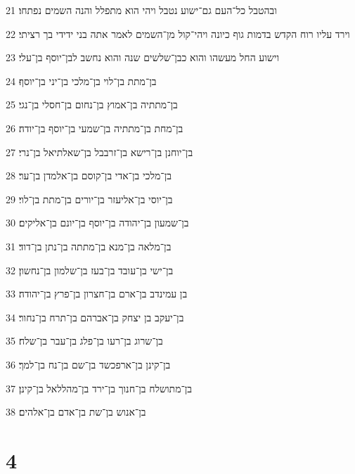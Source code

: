 \par 21 ובהטבל כל־העם גם־ישוע נטבל ויהי הוא מתפלל והנה השמים נפתחו׃
\par 22 וירד עליו רוח הקדש בדמות גוף כיונה ויהי־קול מן־השמים לאמר אתה בני ידידי בך רציתי׃
\par 23 וישוע החל מעשהו והוא כבן־שלשים שנה והוא נחשב לבן־יוסף בן־עלי׃
\par 24 בן־מתת בן־לוי בן־מלכי בן־יני בן־יוסף׃
\par 25 בן־מתתיה בן־אמוץ בן־נחום בן־חסלי בן־נגי׃
\par 26 בן־מחת בן־מתתיה בן־שמעי בן־יוסף בן־יודה׃
\par 27 בן־יוחנן בן־רישא בן־זרבבל בן־שאלתיאל בן־נרי׃
\par 28 בן־מלכי בן־אדי בן־קוסם בן־אלמדן בן־ער׃
\par 29 בן־יוסי בן־אליעזר בן־יורים בן־מתת בן־לוי׃
\par 30 בן־שמעון בן־יהודה בן־יוסף בן־יונם בן־אליקים׃
\par 31 בן־מלאה בן־מנא בן־מתתה בן־נתן בן־דוד׃
\par 32 בן־ישי בן־עובד בן־בעז בן־שלמון בן־נחשון׃
\par 33 בן עמינדב בן־ארם בן־חצרון בן־פרץ בן־יהודה׃
\par 34 בן־יעקב בן יצחק בן־אברהם בן־תרח בן־נחור׃
\par 35 בן־שרוג בן־רעו בן־פלג בן־עבר בן־שלח׃
\par 36 בן־קינן בן־ארפכשד בן־שם בן־נח בן־למך׃
\par 37 בן־מתושלח בן־חנוך בן־ירד בן־מהללאל בן־קינן׃
\par 38 בן־אנוש בן־שת בן־אדם בן־אלהים׃

\chapter{4}

